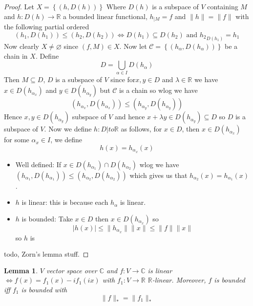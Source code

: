 \documentclass[11pt,a4paper]{article}
\theoremstyle{definition}
\theoremstyle{plain}
\newtheorem{lemma}[definition]{Lemma}
\theoremstyle{remark}
\newcommand{\R}{\mathbb{R}}
\newcommand{\C}{\mathbb{C}}
\renewcommand{\set}[1]{\left\{ #1 \right\}}
\newcommand{\abs}[1]{\lvert #1 \rvert}
\newcommand{\norm}[1]{\lVert #1 \rVert}
\newcommand{\1}{\mathbbm{1}}
\begin{document}
\begin{proof}
    Let $X = \set{(h,D(h))}$ Where $D(h)$ is a subspace of $V$ containing $M$ and $h \colon D(h) \to \R$ a bounded linear functional, $h_{|M} = f$ and $\norm{h} = \norm{f}$ with the following partial ordered 
    $$(h_1, D(h_1)) \le (h_2, D(h_2)) \iff D(h_1) \subseteq D(h_2) \text{ and } {h_2}_{D(h_1)} = h_1$$
    Now clearly $X \ne \varnothing$ since $(f, M) \in X$. Now let $\mathcal{C} = \set{(h_\alpha, D(h_\alpha))}$ be a chain in $X$. Define 
    $$D = \bigcup_{\alpha \in I} D(h_\alpha)$$
    Then $M \subseteq D$, $D$ is a subspace of $V$ since for$ x,y \in D$ and $\lambda \in \R$ we have $x \in D(h_{\alpha_x})$ and $y \in D(h_{\alpha_y})$ but $\mathcal{C}$ is a chain so 
    wlog we have 
    $$(h_{\alpha_x}, D(h_{\alpha_x})) \le (h_{\alpha_y}, D(h_{\alpha_y}))$$
    Hence $x, y \in D(h_{\alpha_y})$ subspace of $V$ and hence $x + \lambda y \in D(h_{\alpha_y}) \subseteq D$ so $D$ is a subspace of $V$. 
    Now we define $h \colon D |to \R$ as follows, for $x \in D$, then $x \in D(h_{\alpha_x})$ for some $\alpha_x \in I$, we define 
    $$h(x) = h_{\alpha_x}  (x)$$
    \begin{itemize}
        \item Well defined: If $x \in D(h_{\alpha_1}) \cap D(h_{\alpha_2})$ wlog we have $(h_{\alpha_1}, D(h_{\alpha_1})) \le (h_{\alpha_2}, D(h_{\alpha_2}))$ which gives us that 
        $h_{\alpha_2}(x) = h_{\alpha_1}(x)$. 

        \item $h$ is linear: this is because each $h_\alpha$ is linear.
        \item $h$ is bounded: Take $x\in D$ then $x \in D(h_{\alpha_x})$ so 
        $$\abs{h(x)} \le \norm{h_{\alpha_x}} \norm{x} \le \norm{f} \norm{x}$$
        so $h$ is 
    \end{itemize}
    todo, Zorn's lemma stuff.
\end{proof}

\begin{lemma}
    $V$ vector space over $\C$ and $f \colon V \to \C$ is linear $\iff f(x) = f_1(x) - if_1(ix)$ with $f_1 \colon V \to \R$ $\R$-linear. Moreover, $f$ is bounded iff $f_1$ is bounded with 
    $$\norm{f}_* = \norm{f_1}_*$$ 
\end{lemma}
\end{document}
